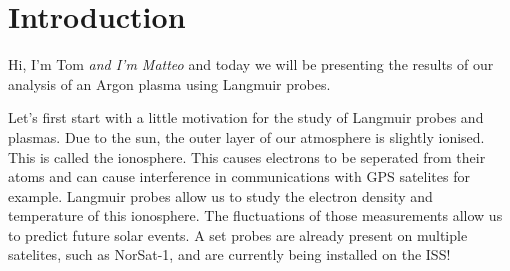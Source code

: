 \section{Introduction}

Hi, I'm Tom \emph{and I'm Matteo} and today we will be presenting the results of our analysis of an Argon plasma using Langmuir probes.

Let's first start with a little motivation for the study of Langmuir probes and plasmas. Due to the sun, the outer layer of our atmosphere is slightly ionised. This is called the ionosphere. This causes electrons to be seperated from their atoms and can cause interference in communications with GPS satelites for example. Langmuir probes allow us to study the electron density and temperature of this ionosphere. The fluctuations of those measurements allow us to predict future solar events. A set probes are already present on multiple satelites, such as NorSat-1, and are currently being installed on the ISS!
